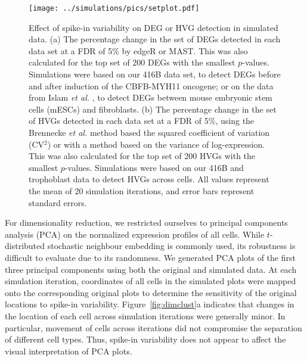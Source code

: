 \documentclass{article}
\begin{document}
\begin{figure}[bt]
    \begin{center}
        \texttt{[image: ../simulations/pics/setplot.pdf]}
    \end{center}
    \caption{Effect of spike-in variability on DEG or HVG detection in simulated data.
        (a) The percentage change in the set of DEGs detected in each data set at a FDR of 5\% by edgeR or MAST.
        This was also calculated for the top set of 200 DEGs with the smallest $p$-values.
        Simulations were based on our 416B data set, to detect DEGs before and after induction of the CBFB-MYH11 oncogene;
        or on the data from Islam \textit{et al.} \cite{islam2011characterization}, to detect DEGs between mouse embryonic stem cells (mESCs) and fibroblasts.
        (b) The percentage change in the set of HVGs detected in each data set at a FDR of 5\%,
        using the Brennecke \textit{et al.} method based the squared coefficient of variation (CV$^2$) or with a method based on the variance of log-expression.
        This was also calculated for the top set of 200 HVGs with the smallest $p$-values.
        Simulations were based on our 416B and trophoblast data to detect HVGs across cells.
        All values represent the mean of 20 simulation iterations, and error bars represent standard errors.
    }
    \label{fig:setchange}
\end{figure}

For dimensionality reduction, we restricted ourselves to principal components analysis (PCA) on the normalized expression profiles of all cells. 
While $t$-distributed stochastic neighbour embedding \cite{van2008visualizing} is commonly used, its robustness is difficult to evaluate due to its randomness.
We generated PCA plots of the first three principal components using both the original and simulated data.
At each simulation iteration, coordinates of all cells in the simulated plots were mapped onto the corresponding original plots to determine the sensitivity of the original locations to spike-in variability.
Figure~\ref{fig:dimclust}a indicates that changes in the location of each cell across simulation iterations were generally minor.
In particular, movement of cells across iterations did not compromise the separation of different cell types. 
Thus, spike-in variability does not appear to affect the visual interpretation of PCA plots.
\end{document}
